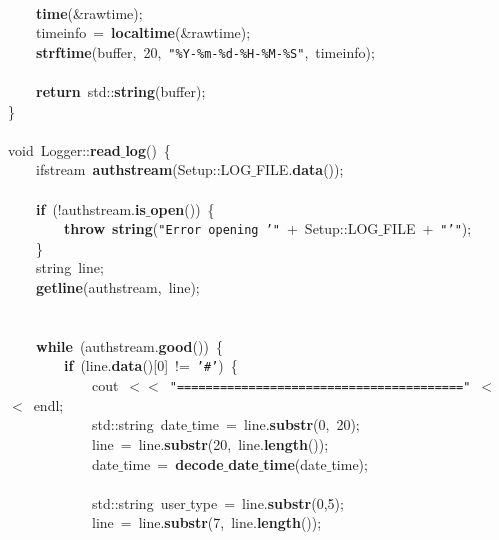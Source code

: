 \mbox{} \\
\mbox{}\ \ \ \ \textbf{time}(\&rawtime); \\
\mbox{}\ \ \ \ timeinfo\ =\ \textbf{localtime}(\&rawtime); \\
\mbox{}\ \ \ \ \textbf{strftime}(buffer,\ 20,\ \texttt{"{}\%Y-\%m-\%d-\%H-\%M-\%S"{}},\ timeinfo); \\
\mbox{} \\
\mbox{}\ \ \ \ \textbf{return}\ std::\textbf{string}(buffer); \\
\mbox{}\} \\
\mbox{} \\
\mbox{}void\ Logger::\textbf{read$\_$log}()\ \{ \\
\mbox{}\ \ \ \ ifstream\ \textbf{authstream}(Setup::LOG$\_$FILE.\textbf{data}()); \\
\mbox{} \\
\mbox{}\ \ \ \ \textbf{if}\ (!authstream.\textbf{is$\_$open}())\ \{ \\
\mbox{}\ \ \ \ \ \ \ \ \textbf{throw}\ \textbf{string}(\texttt{"{}Error\ opening\ '"{}}\ +\ Setup::LOG$\_$FILE\ +\ \texttt{"{}'"{}}); \\
\mbox{}\ \ \ \ \} \\
\mbox{}\ \ \ \ string\ line; \\
\mbox{}\ \ \ \ \textbf{getline}(authstream,\ line); \\
\mbox{} \\
\mbox{} \\
\mbox{}\ \ \ \ \textbf{while}\ (authstream.\textbf{good}())\ \{ \\
\mbox{}\ \ \ \ \ \ \ \ \textbf{if}\ (line.\textbf{data}()[0]\ !=\ \texttt{'\#'})\ \{ \\
\mbox{}\ \ \ \ \ \ \ \ \ \ \ \ cout\ $<$$<$\ \texttt{"{}========================================"{}}\ $<$$<$\ endl; \\
\mbox{}\ \ \ \ \ \ \ \ \ \ \ \ std::string\ date$\_$time\ =\ line.\textbf{substr}(0,\ 20); \\
\mbox{}\ \ \ \ \ \ \ \ \ \ \ \ line\ =\ line.\textbf{substr}(20,\ line.\textbf{length}()); \\
\mbox{}\ \ \ \ \ \ \ \ \ \ \ \ date$\_$time\ =\ \textbf{decode$\_$date$\_$time}(date$\_$time); \\
\mbox{} \\
\mbox{}\ \ \ \ \ \ \ \ \ \ \ \ std::string\ user$\_$type\ =\ line.\textbf{substr}(0,5); \\
\mbox{}\ \ \ \ \ \ \ \ \ \ \ \ line\ =\ line.\textbf{substr}(7,\ line.\textbf{length}()); \\
